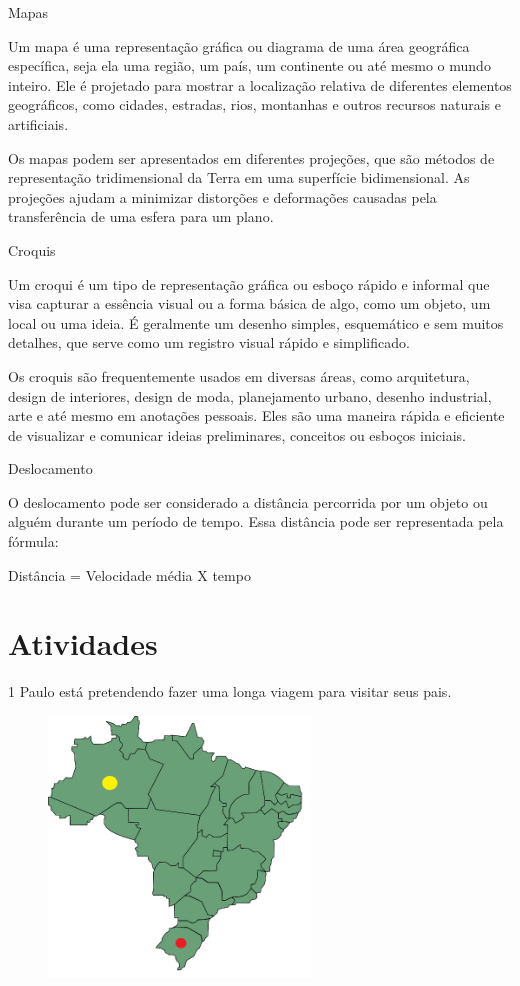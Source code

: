 Mapas

Um mapa é uma representação gráfica ou diagrama de uma área geográfica
específica, seja ela uma região, um país, um continente ou até mesmo o
mundo inteiro. Ele é projetado para mostrar a localização relativa de
diferentes elementos geográficos, como cidades, estradas, rios,
montanhas e outros recursos naturais e artificiais.

Os mapas podem ser apresentados em diferentes projeções, que são métodos
de representação tridimensional da Terra em uma superfície
bidimensional. As projeções ajudam a minimizar distorções e deformações
causadas pela transferência de uma esfera para um plano.

Croquis

Um croqui é um tipo de representação gráfica ou esboço rápido e informal
que visa capturar a essência visual ou a forma básica de algo, como um
objeto, um local ou uma ideia. É geralmente um desenho simples,
esquemático e sem muitos detalhes, que serve como um registro visual
rápido e simplificado.

Os croquis são frequentemente usados em diversas áreas, como
arquitetura, design de interiores, design de moda, planejamento urbano,
desenho industrial, arte e até mesmo em anotações pessoais. Eles são uma
maneira rápida e eficiente de visualizar e comunicar ideias
preliminares, conceitos ou esboços iniciais.

Deslocamento

O deslocamento pode ser considerado a distância percorrida por um objeto
ou alguém durante um período de tempo. Essa distância pode ser
representada pela fórmula:

Distância = Velocidade média X tempo

\section{Atividades}

\num{1} Paulo está pretendendo fazer uma longa viagem para visitar seus pais.

\begin{figure}[H]
\centering\includegraphics[width=2.73952in,height=2.725in]{./imgSAEB_8_MAT/media/image36.png}
\end{figure}


